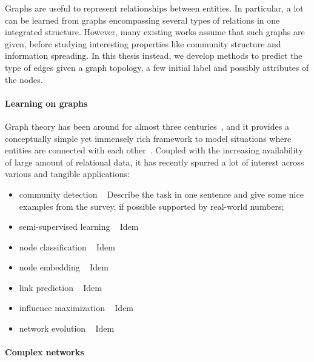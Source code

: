 Graphs are useful to represent relationships between entities. In particular, a lot can be learned
from graphs encompassing several types of relations in one integrated structure. However, many
existing works assume that such graphs are given, before studying interesting properties like
community structure and information spreading. In this thesis instead, we develop methods to predict
the type of edges given a graph topology, a few initial label and possibly attributes of the nodes.
\smallskip

\paragraph{Learning on graphs}

Graph theory has been around for almost three centuries~\autocite{biggs1976graph}, and it provides a
conceptually simple yet immensely rich framework to model situations where entities are connected
with each other~\autocite{ComplexNetworksApp11}. Coupled with the increasing availability of large
amount of relational data, it has recently spurred a lot of interest across various and tangible
applications:
\begin{itemize}[nosep,leftmargin=*]
  \item community detection ~\autocite{FortunatoSurvey10} Describe the task in one sentence and give
    some nice examples from the survey, if possible supported by real-world numbers;
  \item semi-supervised learning ~\autocites{SSL06}{graphSSL14} Idem
  \item node classification ~\autocite{nodeClassif11} Idem
  \item node embedding ~\autocite{representationLearning17} Idem
  \item link prediction ~\autocite{linkPredSurvey16} Idem
  \item influence maximization ~\autocites{infmaxKempe15}{infmax13} Idem
  \item network evolution ~\autocite{networkEvolution14} Idem
\end{itemize}

\vspace{-\baselineskip}
\paragraph{Complex networks}

